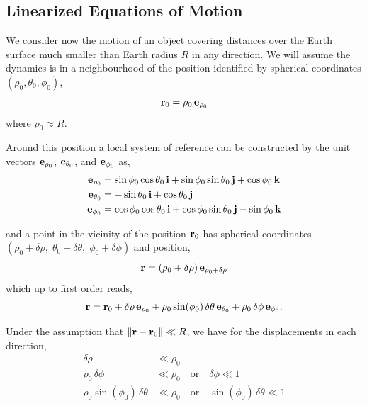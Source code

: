 \documentclass[12pt]{article}
\begin{document}
\subsection{Linearized Equations of Motion}

We consider now the motion of an object covering distances over the Earth surface much
smaller than Earth radius $R$ in any direction. We will assume the dynamics is in a
neighbourhood of the position identified by spherical coordinates $(\rho_0, \theta_0, \phi_0)$,
\begin{equation}
  \vb{r}_0 = \rho_0\,\vb{e}_{\rho_0}
\end{equation}
where $\rho_0 \approx R$.

Around this position a local system of reference can be constructed by the unit vectors
$\vb{e}_{\rho_0}$, $\vb{e}_{\theta_0}$, and $\vb{e}_{\phi_0}$ as,
\begin{align}
  \vb{e}_{\rho_0}   &= \sin\phi_0\cos\theta_0\,\vb{i} + \sin\phi_0\sin\theta_0\,\vb{j} + \cos\phi_0\,\vb{k} \\
  \vb{e}_{\theta_0} &= -\sin\theta_0\,\vb{i} + \cos\theta_0\,\vb{j} \\
  \vb{e}_{\phi_0}   &= \cos\phi_0\cos\theta_0\,\vb{i} + \cos\phi_0\sin\theta_0\,\vb{j} - \sin\phi_0\,\vb{k}
\end{align}

and a point in the vicinity of the position $\vb{r}_0$ has spherical coordinates
$(\rho_0+\delta\rho,\;\theta_0+\delta\theta,\;\phi_0+\delta\phi)$ and position,
\begin{equation}
  \vb{r} = (\rho_0+\delta\rho)\,\vb{e}_{\rho_0+\delta\rho}
\end{equation}
which up to first order reads,
\begin{equation}
  \vb{r} = \vb{r}_0
    + \delta\rho\,\vb{e}_{\rho_0}
    + \rho_0\sin(\phi_0)\,\delta\theta\,\vb{e}_{\theta_0}
    + \rho_0\,\delta\phi\,\vb{e}_{\phi_0}.
\end{equation}

Under the assumption that $\|\vb{r} - \vb{r}_0\| \ll R$, we have for the displacements in
each direction,
\begin{align}
  \delta\rho &\ll \rho_0 \\
  \rho_0\,\delta\phi &\ll \rho_0 \quad\text{or}\quad \delta\phi \ll 1 \\
  \rho_0\sin(\phi_0)\,\delta\theta &\ll \rho_0 \quad\text{or}\quad \sin(\phi_0)\,\delta\theta \ll 1
\end{align}
\end{document}
